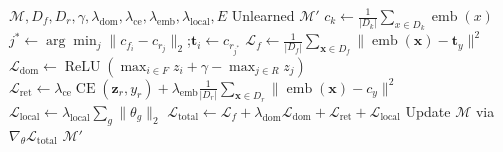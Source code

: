 \begin{algorithm}[htbp]
\caption{Camouflage Unlearning}\label{alg:cu}
\begin{algorithmic}[1]
\scriptsize
\newcommand{\eb}[1]{\operatorname{emb}(#1)}
\newcommand{\Ld}{\mathcal{L}_{\text{dom}}}
\newcommand{\Lr}{\mathcal{L}_{\text{ret}}}
\newcommand{\Ll}{\mathcal{L}_{\text{local}}}
\newcommand{\Lt}{\mathcal{L}_{\text{total}}}
\newcommand{\Lf}{\mathcal{L}_{f}}
\Require $\mathcal{M},D_f,D_r,\gamma,\lambda_{\text{dom}},\lambda_{\text{ce}},\lambda_{\text{emb}},\lambda_{\text{local}},E$
\Ensure Unlearned $\mathcal{M}'$
    \State $c_k\!\gets\!\tfrac{1}{|D_k|}\sum_{x\in D_k}\eb{x}$ \hfill{}
\EndFor
{}
    \State $j^*\!\gets\!\arg\min_j\|c_{f_i}\!-\!c_{r_j}\|_2$;\;$\mathbf{t}_i\!\gets\!c_{r_{j^*}}$ \hfill{}
\EndFor
{}
        \State $\Lf\!\gets\!\tfrac{1}{|D_f|}\sum_{\mathbf{x}\in D_f}\|\eb{\mathbf{x}}\!-\!\mathbf{t}_y\|^2$ \hfill{}
        \State $\Ld\!\gets\!\operatorname{ReLU}(\max_{i\in F}z_i\!+\!\gamma\!-\!\max_{j\in R}z_j)$ \hfill{}
        \State $\Lr\!\gets\!\lambda_{\text{ce}}\operatorname{CE}(\mathbf{z}_r,y_r)+\lambda_{\text{emb}}\tfrac{1}{|D_r|}\sum_{\mathbf{x}\in D_r}\|\eb{\mathbf{x}}\!-\!c_y\|^2$ \hfill{}
        \State $\Ll\!\gets\!\lambda_{\text{local}}\sum_{g}\|\theta_g\!\|_2$ \hfill{}
        \State $\Lt\!\gets\!\Lf\!+\!\lambda_{\text{dom}}\Ld\!+\!\Lr\!+\!\Ll$ \hfill{}
        \State Update $\mathcal{M}$ via $\nabla_\theta\Lt$
    \EndFor
\EndFor
\State \Return $\mathcal{M}'$
\end{algorithmic}
\end{algorithm}
